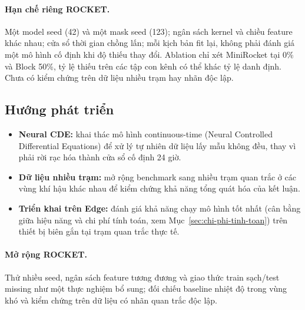 \paragraph{Hạn chế riêng ROCKET.} Một model seed (42) và một mask seed (123); ngân sách kernel và chiều feature khác nhau; cửa sổ thời gian chồng lấn; mỗi kịch bản fit lại, không phải đánh giá một mô hình cố định khi độ thiếu thay đổi. Ablation chỉ xét MiniRocket tại 0\% và Block 50\%, tỷ lệ thiếu trên các tập con kênh có thể khác tỷ lệ danh định. Chưa có kiểm chứng trên dữ liệu nhiều trạm hay nhãn độc lập.

\subsection{Hướng phát triển}
\label{sec:huong-phat-trien}

\begin{itemize}
  \item \textbf{Neural CDE:} khai thác mô hình continuous-time (Neural Controlled
        Differential Equations) để xử lý tự nhiên dữ liệu lấy mẫu không đều, thay vì phải
        rời rạc hóa thành cửa sổ cố định 24 giờ.
  \item \textbf{Dữ liệu nhiều trạm:} mở rộng benchmark sang nhiều trạm quan trắc ở các
        vùng khí hậu khác nhau để kiểm chứng khả năng tổng quát hóa của kết luận.
  \item \textbf{Triển khai trên Edge:} đánh giá khả năng chạy mô hình tốt nhất (cân bằng
        giữa hiệu năng và chi phí tính toán, xem Mục~\ref{sec:chi-phi-tinh-toan}) trên
        thiết bị biên gắn tại trạm quan trắc thực tế.
\end{itemize}

\paragraph{Mở rộng ROCKET.} Thử nhiều seed, ngân sách feature tương đương và giao thức train sạch/test missing như một thực nghiệm bổ sung; đối chiếu baseline nhiệt độ trong vùng khó và kiểm chứng trên dữ liệu có nhãn quan trắc độc lập.

